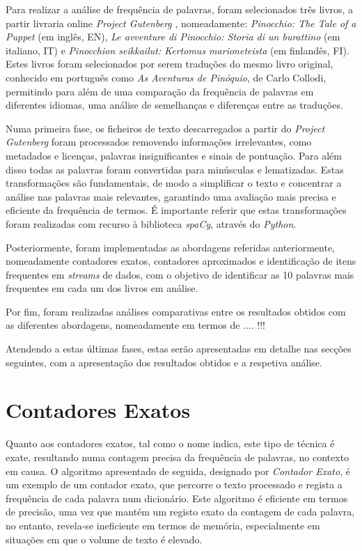 \documentclass[mirror, portugues]{revdetua}
\begin{document}
Para realizar a análise de frequência de palavras, foram selecionados três livros, a partir livraria online \textit{Project Gutenberg} \cite{PG24}, nomeadamente: \textit{Pinocchio: The Tale of a Puppet} (em inglês, EN), \textit{Le avventure di Pinocchio: Storia di un burattino} (em italiano, IT) e \textit{Pinocchion seikkailut: Kertomus marioneteista} (em finlandês, FI). Estes livros foram selecionados por serem traduções do mesmo livro original, conhecido em português como \textit{As Aventuras de Pinóquio}, de Carlo Collodi, permitindo para além de uma comparação da frequência de palavras em diferentes idiomas, uma análise de semelhanças e diferenças entre as traduções.


Numa primeira fase, os ficheiros de texto descarregados a partir do \textit{Project Gutenberg} foram processados removendo informações irrelevantes, como metadados e licenças, palavras insignificantes e sinais de pontuação. Para além disso todas as palavras foram convertidas para minúsculas e lematizadas. Estas transformações são fundamentais, de modo a simplificar o texto e concentrar a análise nas palavras mais relevantes, garantindo uma avaliação mais precisa e eficiente da frequência de termos. É importante referir que estas transformações foram realizadas com recurso à biblioteca \textit{spaCy}, através do \textit{Python}.

Posteriormente, foram implementadas as abordagens referidas anteriormente, nomeadamente contadores exatos, contadores aproximados e identificação de itens frequentes em \textit{streams} de dados, com o objetivo de identificar as 10 palavras mais frequentes em cada um dos livros em análise.

Por fim, foram realizadas análises comparativas entre os resultados obtidos com as diferentes abordagens, nomeadamente em termos de .... !!! %

Atendendo a estas últimas fases, estas serão apresentadas em detalhe nas secções seguintes, com a apresentação dos resultados obtidos e a respetiva análise.

\section{Contadores Exatos}

Quanto aos contadores exatos, tal como o nome indica, este tipo de técnica é exate, resultando numa contagem precisa da frequência de palavras, no contexto em causa.
O algoritmo apresentado de seguida, designado por \textit{Contador Exato}, é um exemplo de um contador exato, que percorre o texto processado e regista a frequência de cada palavra num dicionário. Este algoritmo é eficiente em termos de precisão, uma vez que mantém um registo exato da contagem de cada palavra, no entanto, revela-se ineficiente em termos de memória, especialmente em situações em que o volume de texto é elevado.
\end{document}
